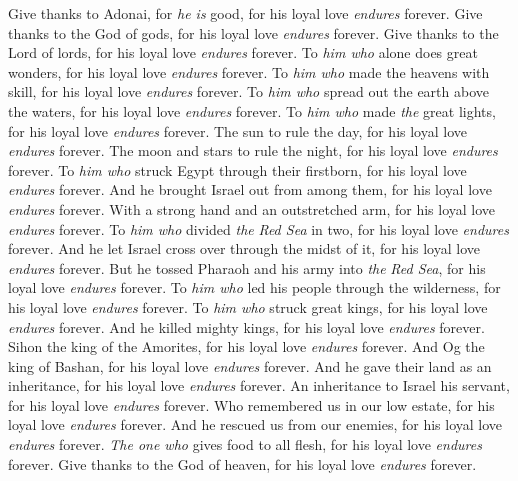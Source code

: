 \begin{biblechapter} %
 Give thanks to Adonai, for \textit{he is} good, 
for his loyal love \textit{endures} forever.
\verse Give thanks to the God of gods, 
for his loyal love \textit{endures} forever.
\verse Give thanks to the Lord of lords, 
for his loyal love \textit{endures} forever.
\verse To \textit{him who} alone does great wonders, 
for his loyal love \textit{endures} forever.
\verse To \textit{him who} made the heavens with skill, 
for his loyal love \textit{endures} forever.
\verse To \textit{him who} spread out the earth above the waters, 
for his loyal love \textit{endures} forever.
\verse To \textit{him who} made \textit{the} great lights, 
for his loyal love \textit{endures} forever.
\verse The sun to rule the day, 
for his loyal love \textit{endures} forever.
\verse The moon and stars to rule the night, 
for his loyal love \textit{endures} forever.
\verse To \textit{him who} struck Egypt through their firstborn, 
for his loyal love \textit{endures} forever.
\verse And he brought Israel out from among them, 
for his loyal love \textit{endures} forever.
\verse With a strong hand and an outstretched arm, 
for his loyal love \textit{endures} forever.
\verse To \textit{him who} divided \textit{the} \textit{Red Sea} in two, 
for his loyal love \textit{endures} forever.
\verse And he let Israel cross over through the midst of it, 
for his loyal love \textit{endures} forever.
\verse But he tossed Pharaoh and his army into \textit{the} \textit{Red Sea}, 
for his loyal love \textit{endures} forever.
\verse To \textit{him who} led his people through the wilderness, 
for his loyal love \textit{endures} forever.
\verse To \textit{him who} struck great kings, 
for his loyal love \textit{endures} forever.
\verse And he killed mighty kings, 
for his loyal love \textit{endures} forever.
\verse Sihon the king of the Amorites, 
for his loyal love \textit{endures} forever.
\verse And Og the king of Bashan, 
for his loyal love \textit{endures} forever.
\verse And he gave their land as an inheritance, 
for his loyal love \textit{endures} forever.
\verse An inheritance to Israel his servant, 
for his loyal love \textit{endures} forever.
\verse Who remembered us in our low estate, 
for his loyal love \textit{endures} forever.
\verse And he rescued us from our enemies, 
for his loyal love \textit{endures} forever.
\verse \textit{The one who} gives food to all flesh, 
for his loyal love \textit{endures} forever.
\verse Give thanks to the God of heaven, 
for his loyal love \textit{endures} forever.
\end{biblechapter}

